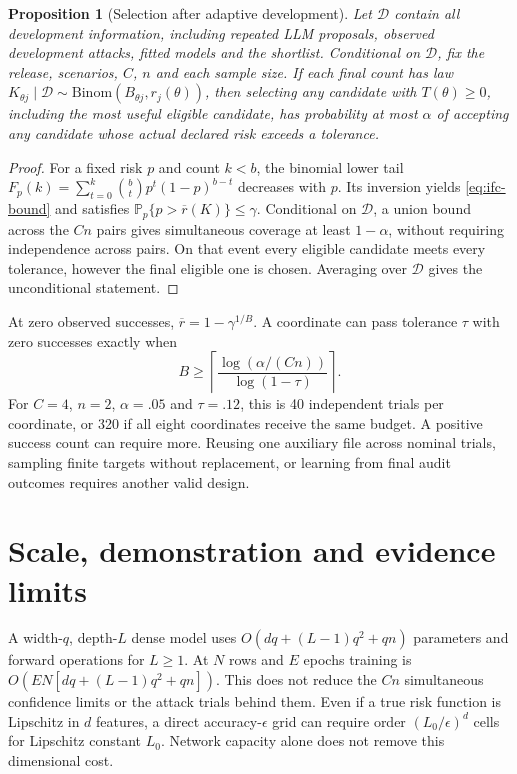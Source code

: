 \documentclass[10pt,a4paper]{article}
\theoremstyle{plain}
\newtheorem{proposition}{Proposition}
\newcommand{\Prob}{\mathbb P}
\begin{document}
\begin{proposition}[Selection after adaptive development]
Let $\mathcal D$ contain all development information, including repeated
LLM proposals, observed development attacks, fitted models and the shortlist.
Conditional on $\mathcal D$, fix the release, scenarios, $C$, $n$ and each
sample size. If each final count has law
$K_{\theta j}\mid\mathcal D\sim\mathrm{Binom}(B_{\theta j},r_j(\theta))$,
then selecting any candidate with $T(\theta)\geq0$, including the most useful
eligible candidate, has probability at most $\alpha$ of accepting any candidate
whose actual declared risk exceeds a tolerance.
\end{proposition}
\begin{proof}
For a fixed risk $p$ and count $k<b$, the binomial lower tail
$F_p(k)=\sum_{t=0}^k\binom bt p^t(1-p)^{b-t}$ decreases with $p$.
Its inversion yields \eqref{eq:ifc-bound} and satisfies
$\Prob_p\{p>\overline r(K)\}\leq\gamma$. Conditional on $\mathcal D$,
a union bound across the $Cn$ pairs gives simultaneous coverage at least
$1-\alpha$, without requiring independence across pairs. On that event every
eligible candidate meets every tolerance, however the final eligible one is
chosen. Averaging over $\mathcal D$ gives the unconditional statement.
\end{proof}

At zero observed successes,
$\overline r=1-\gamma^{1/B}$. A coordinate can pass tolerance $\tau$
with zero successes exactly when
\begin{equation}
 B\geq\left\lceil\frac{\log(\alpha/(Cn))}{\log(1-\tau)}\right\rceil.
 \label{eq:ifc-budget}
\end{equation}
For $C=4$, $n=2$, $\alpha=.05$ and $\tau=.12$, this is 40 independent
trials per coordinate, or 320 if all eight coordinates receive the same
budget. A positive success count can require more. Reusing one auxiliary
file across nominal trials, sampling finite targets without replacement, or
learning from final audit outcomes requires another valid design.

\clearpage
\section{Scale, demonstration and evidence limits}

A width-$q$, depth-$L$ dense model uses
$O(dq+(L-1)q^2+qn)$ parameters and forward operations for $L\geq1$.
At $N$ rows and $E$ epochs training is
$O(EN[dq+(L-1)q^2+qn])$. This does not reduce the $Cn$ simultaneous
confidence limits or the attack trials behind them. Even if a true risk
function is Lipschitz in $d$ features, a direct accuracy-$\epsilon$ grid
can require order $(L_0/\epsilon)^d$ cells for Lipschitz constant $L_0$.
Network capacity alone does not remove this dimensional cost.
\end{document}
